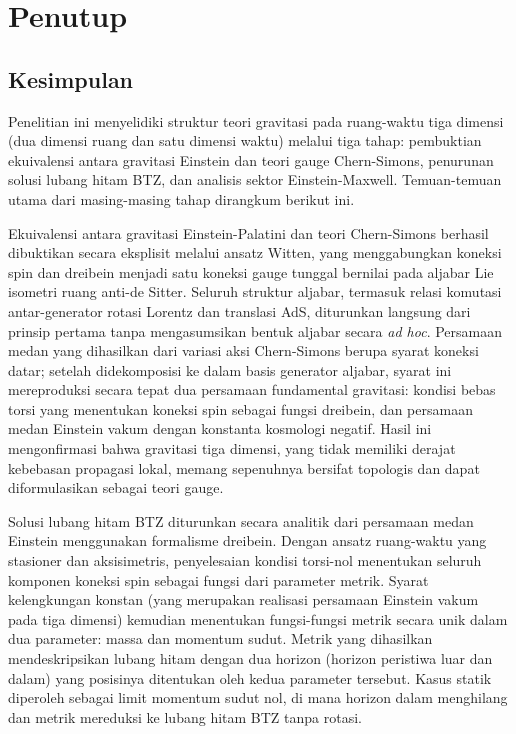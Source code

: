 \chapter{Penutup}

\section{Kesimpulan}

Penelitian ini menyelidiki struktur teori gravitasi pada ruang-waktu tiga dimensi (dua dimensi ruang dan satu dimensi waktu) melalui tiga tahap: pembuktian ekuivalensi antara gravitasi Einstein dan teori gauge Chern-Simons, penurunan solusi lubang hitam BTZ, dan analisis sektor Einstein-Maxwell. Temuan-temuan utama dari masing-masing tahap dirangkum berikut ini.

Ekuivalensi antara gravitasi Einstein-Palatini dan teori Chern-Simons berhasil dibuktikan secara eksplisit melalui ansatz Witten, yang menggabungkan koneksi spin dan dreibein menjadi satu koneksi gauge tunggal bernilai pada aljabar Lie isometri ruang anti-de Sitter. Seluruh struktur aljabar, termasuk relasi komutasi antar-generator rotasi Lorentz dan translasi AdS, diturunkan langsung dari prinsip pertama tanpa mengasumsikan bentuk aljabar secara \textit{ad hoc}. Persamaan medan yang dihasilkan dari variasi aksi Chern-Simons berupa syarat koneksi datar; setelah didekomposisi ke dalam basis generator aljabar, syarat ini mereproduksi secara tepat dua persamaan fundamental gravitasi: kondisi bebas torsi yang menentukan koneksi spin sebagai fungsi dreibein, dan persamaan medan Einstein vakum dengan konstanta kosmologi negatif. Hasil ini mengonfirmasi bahwa gravitasi tiga dimensi, yang tidak memiliki derajat kebebasan propagasi lokal, memang sepenuhnya bersifat topologis dan dapat diformulasikan sebagai teori gauge.

Solusi lubang hitam BTZ diturunkan secara analitik dari persamaan medan Einstein menggunakan formalisme dreibein. Dengan ansatz ruang-waktu yang stasioner dan aksisimetris, penyelesaian kondisi torsi-nol menentukan seluruh komponen koneksi spin sebagai fungsi dari parameter metrik. Syarat kelengkungan konstan (yang merupakan realisasi persamaan Einstein vakum pada tiga dimensi) kemudian menentukan fungsi-fungsi metrik secara unik dalam dua parameter: massa dan momentum sudut. Metrik yang dihasilkan mendeskripsikan lubang hitam dengan dua horizon (horizon peristiwa luar dan dalam) yang posisinya ditentukan oleh kedua parameter tersebut. Kasus statik diperoleh sebagai limit momentum sudut nol, di mana horizon dalam menghilang dan metrik mereduksi ke lubang hitam BTZ tanpa rotasi.


